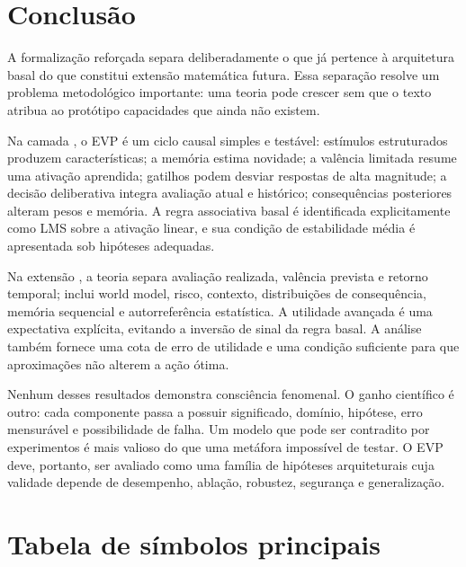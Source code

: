 \section{Conclusão}

A formalização reforçada separa deliberadamente o que já pertence à arquitetura basal do que constitui extensão matemática futura. Essa separação resolve um problema metodológico importante: uma teoria pode crescer sem que o texto atribua ao protótipo capacidades que ainda não existem.

Na camada \EVPB, o EVP é um ciclo causal simples e testável: estímulos estruturados produzem características; a memória estima novidade; a valência limitada resume uma ativação aprendida; gatilhos podem desviar respostas de alta magnitude; a decisão deliberativa integra avaliação atual e histórico; consequências posteriores alteram pesos e memória. A regra associativa basal é identificada explicitamente como LMS sobre a ativação linear, e sua condição de estabilidade média é apresentada sob hipóteses adequadas.

Na extensão \EVPM, a teoria separa avaliação realizada, valência prevista e retorno temporal; inclui world model, risco, contexto, distribuições de consequência, memória sequencial e autorreferência estatística. A utilidade avançada é uma expectativa explícita, evitando a inversão de sinal da regra basal. A análise também fornece uma cota de erro de utilidade e uma condição suficiente para que aproximações não alterem a ação ótima.

Nenhum desses resultados demonstra consciência fenomenal. O ganho científico é outro: cada componente passa a possuir significado, domínio, hipótese, erro mensurável e possibilidade de falha. Um modelo que pode ser contradito por experimentos é mais valioso do que uma metáfora impossível de testar. O EVP deve, portanto, ser avaliado como uma família de hipóteses arquiteturais cuja validade depende de desempenho, ablação, robustez, segurança e generalização.

\printbibliography[title={REFERÊNCIAS}]

\appendix
\section{Tabela de símbolos principais}

